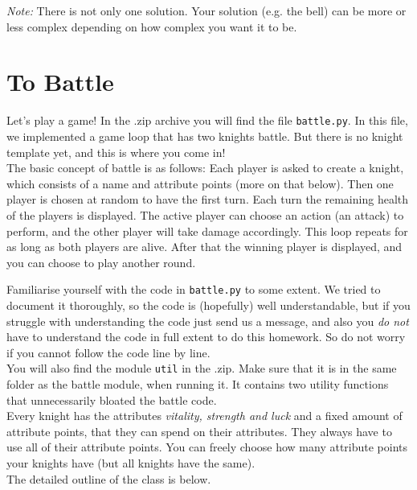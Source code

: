 \noindent\textit{Note:} There is not only one solution. Your solution (e.g. the bell) can
be more or less complex depending on how complex you want it to be.

\section{To Battle}
Let's play a game! In the .zip archive you will find the file \texttt{battle.py}.
In this file, we implemented a game loop that has two knights battle. But there
is no knight template yet, and this is where you come in!\\
The basic concept of battle is as follows: Each player is asked to create a knight,
which consists of a name and attribute points (more on that below). Then one player
is chosen at random to have the first turn. Each turn the remaining health of the
players is displayed. The active player can choose an action (an attack)
to perform, and the other player will take damage accordingly. This loop repeats
for as long as both players are alive. After that the winning player is displayed,
and you can choose to play another round.

\noindent Familiarise yourself with the code in \texttt{battle.py} to some extent. We tried to 
document it thoroughly, so the code is (hopefully) well understandable, but if you
struggle with understanding the code just send us a message, and also you
\textit{do not} have to understand the code in full extent to do this homework. So do not
worry if you cannot follow the code line by line.\\
You will also find the module \texttt{util} in the .zip. Make sure that it is in the same folder
as the battle module, when running it. It contains two utility functions that unnecessarily
bloated the battle code.\\

\noindent Every knight has the attributes \textit{vitality, strength and luck} and a 
fixed amount of attribute points, that they can spend on their attributes.
They always have to use all of their attribute points. You can freely
choose how many attribute points your knights have (but all knights have the same).\\
The detailed outline of the class is below.\\

